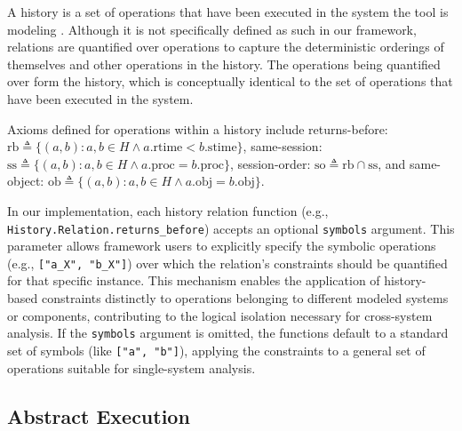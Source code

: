 %
%

A history is a set of operations that have been executed in the
system the tool is modeling \cite{viotti2016consistency}. Although it
is not specifically defined as such in our framework, relations are
quantified over operations to capture the deterministic
orderings of themselves and other operations in the history. The
operations being quantified over form the history, which is
conceptually identical to the set of operations that have been
executed in the system.

Axioms defined for operations within a history include
returns-before: $\text{rb} \triangleq \{(a, b) : a, b \in H
\wedge a.\text{rtime} < b.\text{stime}\}$,
same-session: $\text{ss} \triangleq \{(a, b) : a, b \in H \wedge
a.\text{proc} = b.\text{proc}\}$, session-order:
$\text{so} \triangleq \text{rb} \cap \text{ss}$, and
same-object: $\text{ob} \triangleq \{(a, b) : a, b \in H \wedge
a.\text{obj} = b.\text{obj}\}$.

In our implementation, each history relation function (e.g.,
\texttt{History.Relation.returns\_before}) accepts an optional
\texttt{symbols} argument. This parameter allows framework users to
explicitly specify the symbolic operations (e.g., \texttt{["a\_X",
"b\_X"]}) over which the relation's constraints should be quantified
for that specific instance. This mechanism enables the application of
history-based constraints distinctly to operations belonging to
different modeled systems or components, contributing to the logical
isolation necessary for cross-system analysis. If the
\texttt{symbols} argument is omitted, the functions default to a
standard set of symbols (like \texttt{["a", "b"]}), applying the
constraints to a general set of operations suitable for single-system analysis.

\subsection{Abstract Execution}

%
%

